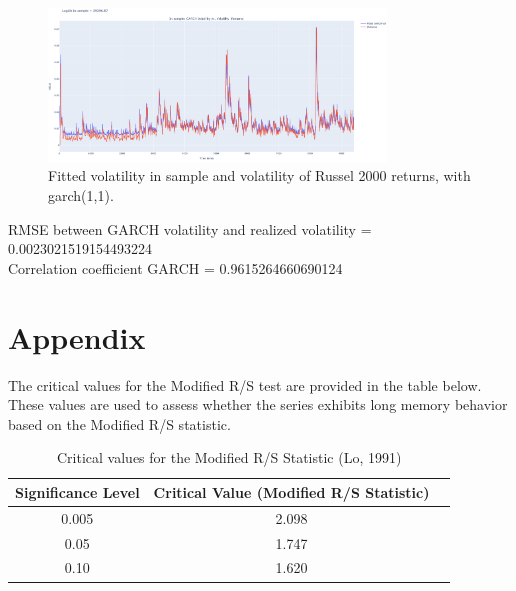 \documentclass[11pt]{extarticle}
\begin{document}
\begin{figure}[!ht]
    \centering
    \includegraphics[width=0.8\textwidth]{img/garch_vol}
    \caption{Fitted volatility in sample and volatility of Russel 2000 returns, with garch(1,1).}
    \label{fig:garch_fitted_vol}
\end{figure}

\FloatBarrier

RMSE between GARCH volatility and realized volatility = 0.0023021519154493224 \\

Correlation coefficient GARCH = 0.9615264660690124 \\

\section{Appendix}

The critical values for the Modified R/S test are provided in the table below. These values are used to assess whether the series exhibits long memory behavior based on the Modified R/S statistic.

\begin{table}[ht!]
\centering
\begin{tabular}{|c|c|c|}
\hline
\textbf{Significance Level} & \textbf{Critical Value (Modified R/S Statistic)} \\
\hline
0.005 & 2.098\\
0.05 & 1.747\\
0.10 & 1.620\\

\hline
\end{tabular}
\caption{Critical values for the Modified R/S Statistic (Lo, 1991)}
\end{table}
\end{document}
